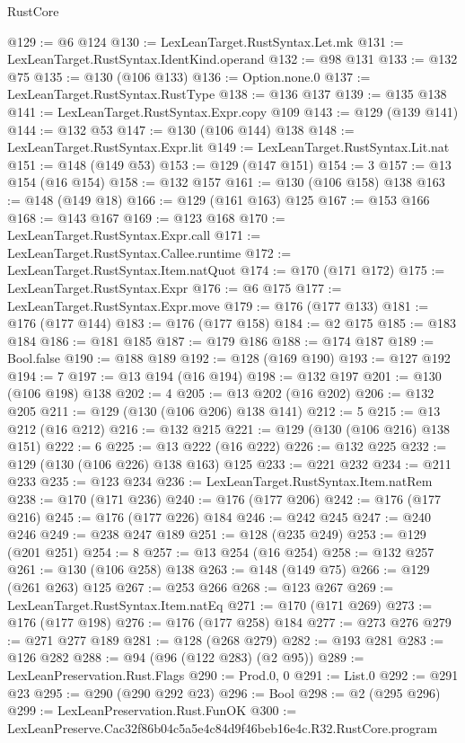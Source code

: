 \begin{lexlean}{RustCore}
\begin{coremodule}
@129 := @6 @124
@130 := LexLeanTarget.RustSyntax.Let.mk
@131 := LexLeanTarget.RustSyntax.IdentKind.operand
@132 := @98 @131
@133 := @132 @75
@135 := @130 (@106 @133)
@136 := Option.none.{0}
@137 := LexLeanTarget.RustSyntax.RustType
@138 := @136 @137
@139 := @135 @138
@141 := LexLeanTarget.RustSyntax.Expr.copy @109
@143 := @129 (@139 @141)
@144 := @132 @53
@147 := @130 (@106 @144) @138
@148 := LexLeanTarget.RustSyntax.Expr.lit
@149 := LexLeanTarget.RustSyntax.Lit.nat
@151 := @148 (@149 @53)
@153 := @129 (@147 @151)
@154 := 3
@157 := @13 @154 (@16 @154)
@158 := @132 @157
@161 := @130 (@106 @158) @138
@163 := @148 (@149 @18)
@166 := @129 (@161 @163) @125
@167 := @153 @166
@168 := @143 @167
@169 := @123 @168
@170 := LexLeanTarget.RustSyntax.Expr.call
@171 := LexLeanTarget.RustSyntax.Callee.runtime
@172 := LexLeanTarget.RustSyntax.Item.natQuot
@174 := @170 (@171 @172)
@175 := LexLeanTarget.RustSyntax.Expr
@176 := @6 @175
@177 := LexLeanTarget.RustSyntax.Expr.move
@179 := @176 (@177 @133)
@181 := @176 (@177 @144)
@183 := @176 (@177 @158)
@184 := @2 @175
@185 := @183 @184
@186 := @181 @185
@187 := @179 @186
@188 := @174 @187
@189 := Bool.false
@190 := @188 @189
@192 := @128 (@169 @190)
@193 := @127 @192
@194 := 7
@197 := @13 @194 (@16 @194)
@198 := @132 @197
@201 := @130 (@106 @198) @138
@202 := 4
@205 := @13 @202 (@16 @202)
@206 := @132 @205
@211 := @129 (@130 (@106 @206) @138 @141)
@212 := 5
@215 := @13 @212 (@16 @212)
@216 := @132 @215
@221 := @129 (@130 (@106 @216) @138 @151)
@222 := 6
@225 := @13 @222 (@16 @222)
@226 := @132 @225
@232 := @129 (@130 (@106 @226) @138 @163) @125
@233 := @221 @232
@234 := @211 @233
@235 := @123 @234
@236 := LexLeanTarget.RustSyntax.Item.natRem
@238 := @170 (@171 @236)
@240 := @176 (@177 @206)
@242 := @176 (@177 @216)
@245 := @176 (@177 @226) @184
@246 := @242 @245
@247 := @240 @246
@249 := @238 @247 @189
@251 := @128 (@235 @249)
@253 := @129 (@201 @251)
@254 := 8
@257 := @13 @254 (@16 @254)
@258 := @132 @257
@261 := @130 (@106 @258) @138
@263 := @148 (@149 @75)
@266 := @129 (@261 @263) @125
@267 := @253 @266
@268 := @123 @267
@269 := LexLeanTarget.RustSyntax.Item.natEq
@271 := @170 (@171 @269)
@273 := @176 (@177 @198)
@276 := @176 (@177 @258) @184
@277 := @273 @276
@279 := @271 @277 @189
@281 := @128 (@268 @279)
@282 := @193 @281
@283 := @126 @282
@288 := @94 (@96 (@122 @283) (@2 @95))
@289 := LexLeanPreservation.Rust.Flags
@290 := Prod.{0, 0}
@291 := List.{0}
@292 := @291 @23
@295 := @290 (@290 @292 @23)
@296 := Bool
@298 := @2 (@295 @296)
@299 := LexLeanPreservation.Rust.FunOK
@300 := LexLeanPreserve.Cac32f86b04c5a5e4c84d9f46beb16e4c.R32.RustCore.program

\end{coremodule}
\end{lexlean}
